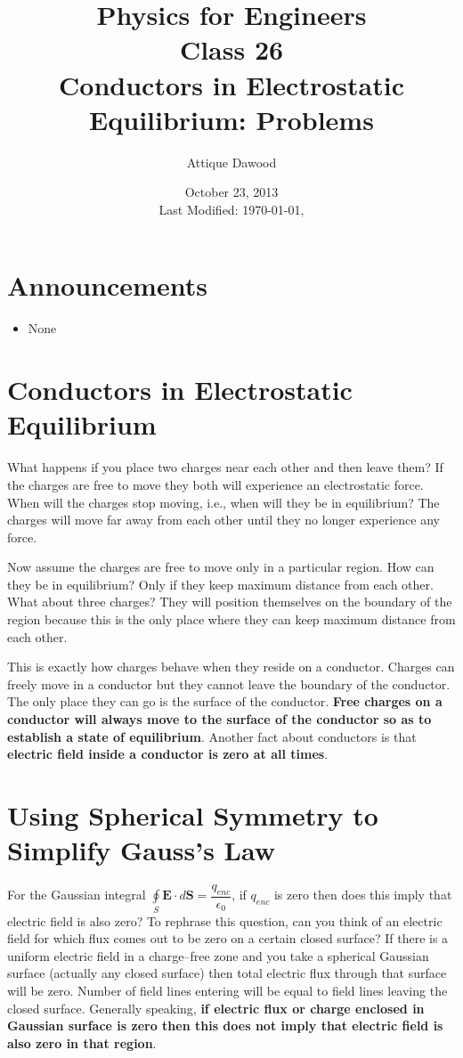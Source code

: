 \documentclass[12pt,a4paper]{article}
\title{\vspace{-3cm}Physics for Engineers\\Class 26\\Conductors in Electrostatic Equilibrium: Problems}
\author{Attique Dawood}
\date{October 23, 2013\\[0.2cm] Last Modified: \today, \currenttime}
\begin{document}
\maketitle
\section{Announcements}
\begin{itemize}
\item None
\end{itemize}
\section{Conductors in Electrostatic Equilibrium}
What happens if you place two charges near each other and then leave them? If the charges are free to move they both will experience an electrostatic force. When will the charges stop moving, i.e., when will they be in equilibrium? The charges will move far away from each other until they no longer experience any force.

Now assume the charges are free to move only in a particular region. How can they be in equilibrium? Only if they keep maximum distance from each other. What about three charges? They will position themselves on the boundary of the region because this is the only place where they can keep maximum distance from each other.

This is exactly how charges behave when they reside on a conductor. Charges can freely move in a conductor but they cannot leave the boundary of the conductor. The only place they can go is the surface of the conductor. \textbf{Free charges on a conductor will always move to the surface of the conductor so as to establish a state of equilibrium}. Another fact about conductors is that \textbf{electric field inside a conductor is zero at all times}.
\section{Using Spherical Symmetry to Simplify Gauss's Law}
For the Gaussian integral $\oint\limits_{S} \textbf{E}\cdot d\textbf{S}=\dfrac{q_{enc}}{\epsilon_0}$, if $q_{enc}$ is zero then does this imply that electric field is also zero? To rephrase this question, can you think of an electric field for which flux comes out to be zero on a certain closed surface? If there is a uniform electric field in a charge--free zone and you take a spherical Gaussian surface (actually any closed surface) then total electric flux through that surface will be zero. Number of field lines entering will be equal to field lines leaving the closed surface. Generally speaking, \textbf{if electric flux or charge enclosed in Gaussian surface is zero then this does not imply that electric field is also zero in that region}.
\end{document}
